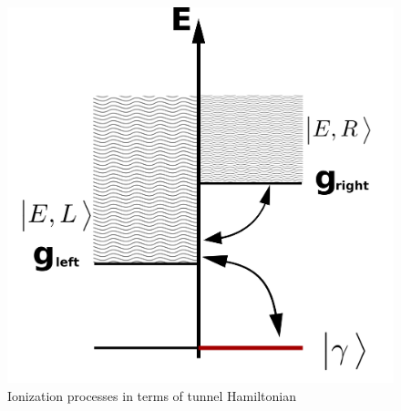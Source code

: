 \begin{figure}[H]
	\centering
	\includegraphics[width=0.65\linewidth]{images/tunneling}
	\caption{Ionization processes in terms of tunnel Hamiltonian}
	\label{fig:tunneling}
\end{figure}

